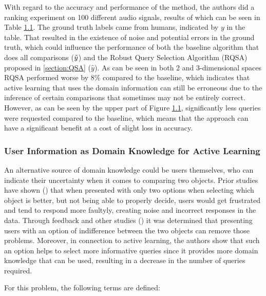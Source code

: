 \documentclass[
  letterpaper,
  DIV=11,
  numbers=noendperiod,
  oneside]{scrreprt}
\theoremstyle{remark}
\begin{document}
With regard to the accuracy and performance of the method, the authors
did a ranking experiment on 100 different audio signals, results of
which can be seen in Table \hyperref[fig:geo_acc]{1.1}. The ground truth
labels came from humans, indicated by \(y\) in the table. That resulted
in the existence of noise and potential errors in the ground truth,
which could influence the performance of both the baseline algorithm
that does all comparisons (\(\Tilde{y}\)) and the Robust Query Selection
Algorithm (RQSA) proposed in \hyperref[section:QSA]{{[}section:QSA{]}}
(\(\hat{y}\)). As can be seen in both 2 and 3-dimensional spaces RQSA
performed worse by \(8\%\) compared to the baseline, which indicates
that active learning that uses the domain information can still be
erroneous due to the inference of certain comparisons that sometimes may
not be entirely correct. However, as can be seen by the upper part of
Figure \hyperref[fig:geo_acc]{1.1}, significantly less queries were
requested compared to the baseline, which means that the approach can
have a significant benefit at a cost of slight loss in accuracy.
\label{sec:geo_app}{}

\subsubsection{User Information as Domain Knowledge for Active
Learning}\label{user-information-as-domain-knowledge-for-active-learning}

An alternative source of domain knowledge could be users themselves, who
can indicate their uncertainty when it comes to comparing two objects.
Prior studies have shown () that when presented with only two options when selecting which
object is better, but not being able to properly decide, users would get
frustrated and tend to respond more faultyly, creating noise and
incorrect responses in the data. Through feedback and other studies
() it was
determined that presenting users with an option of indifference between
the two objects can remove those problems. Moreover, in connection to
active learning, the authors show that such an option helps to select
more informative queries since it provides more domain knowledge that
can be used, resulting in a decrease in the number of queries required.

For this problem, the following terms are defined:
\end{document}
